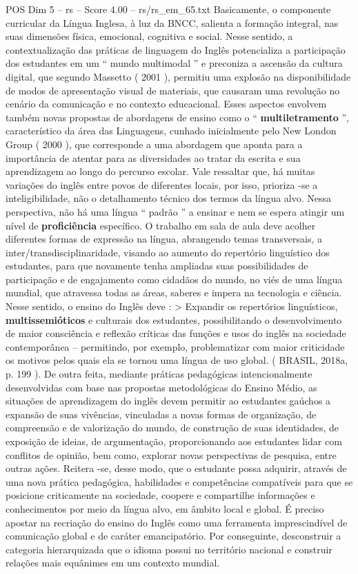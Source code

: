 \begin{textsample}{POS Dim 5 – rs – Score 4.00 – rs/rs\_em\_65.txt}
Basicamente, o componente curricular da Língua Inglesa, à luz da BNCC, salienta a formação integral, nas suas dimensões física, emocional, cognitiva e social.
Nesse sentido, a contextualização das práticas de linguagem do Inglês potencializa a participação dos estudantes em um “ mundo multimodal ” e preconiza a ascensão da cultura digital, que segundo Massetto ( 2001 ), permitiu uma explosão na disponibilidade de modos de apresentação visual de materiais, que causaram uma revolução no cenário da comunicação e no contexto educacional.
Esses aspectos envolvem também novas propostas de abordagens de ensino como o “ \textbf{multiletramento} ”, característico da área das Linguagens, cunhado inicialmente pelo New London Group ( 2000 ), que corresponde a uma abordagem que aponta para a importância de atentar para as diversidades ao tratar da escrita e sua aprendizagem ao longo do percurso escolar.
Vale ressaltar que, há muitas variações do inglês entre povos de diferentes locais, por isso, prioriza -se a inteligibilidade, não o detalhamento técnico dos termos da língua alvo.
Nessa perspectiva, não há uma língua “ padrão ” a ensinar e nem se espera atingir um nível de \textbf{proficiência} específico.
O trabalho em sala de aula deve acolher diferentes formas de expressão na língua, abrangendo temas transversais, a inter/transdisciplinaridade, visando ao aumento do repertório linguístico dos estudantes, para que novamente tenha ampliadas suas possibilidades de participação e de engajamento como cidadãos do mundo, no viés de uma língua mundial, que atravessa todas as áreas, saberes e impera na tecnologia e ciência.
Nesse sentido, o ensino do Inglês deve : > Expandir os repertórios linguísticos, \textbf{multissemióticos} e culturais dos estudantes, possibilitando o desenvolvimento de maior consciência e reflexão críticas das funções e usos do inglês na sociedade contemporânea – permitindo, por exemplo, problematizar com maior criticidade os motivos pelos quais ela se tornou uma língua de uso global. ( BRASIL, 2018a, p. 199 ).
De outra feita, mediante práticas pedagógicas intencionalmente desenvolvidas com base nas propostas metodológicas do Ensino Médio, as situações de aprendizagem do inglês devem permitir ao estudantes gaúchos a expansão de suas vivências, vinculadas a novas formas de organização, de compreensão e de valorização do mundo, de construção de suas identidades, de exposição de ideias, de argumentação, proporcionando aos estudantes lidar com conflitos de opinião, bem como, explorar novas perspectivas de pesquisa, entre outras ações.
Reitera -se, desse modo, que o estudante possa adquirir, através de uma nova prática pedagógica, habilidades e competências compatíveis para que se posicione criticamente na sociedade, coopere e compartilhe informações e conhecimentos por meio da língua alvo, em âmbito local e global.
É preciso apostar na recriação do ensino do Inglês como uma ferramenta imprescindível de comunicação global e de caráter emancipatório.
Por conseguinte, desconstruir a categoria hierarquizada que o idioma possui no território nacional e construir relações mais equânimes em um contexto mundial.

\end{textsample}
